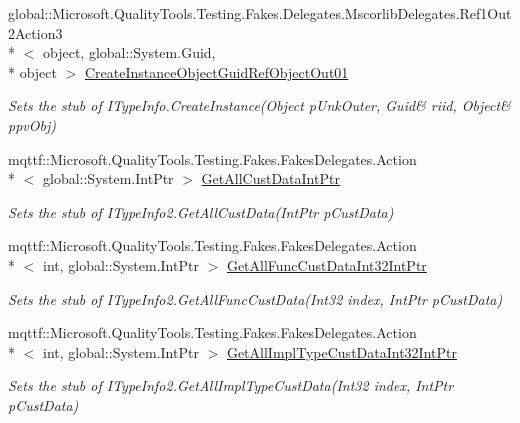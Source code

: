 \begin{DoxyCompactItemize}
global\-::\-Microsoft.\-Quality\-Tools.\-Testing.\-Fakes.\-Delegates.\-Mscorlib\-Delegates.\-Ref1\-Out2\-Action3\\*
$<$ object, global\-::\-System.\-Guid, \\*
object $>$ \hyperlink{class_system_1_1_runtime_1_1_interop_services_1_1_com_types_1_1_fakes_1_1_stub_i_type_info2_a23343d664fbd611dba2e77315f9fc012}{Create\-Instance\-Object\-Guid\-Ref\-Object\-Out01}
\begin{DoxyCompactList}\small\item\em Sets the stub of I\-Type\-Info.\-Create\-Instance(Object p\-Unk\-Outer, Guid\& riid, Object\& ppv\-Obj)\end{DoxyCompactList}\item 
mqttf\-::\-Microsoft.\-Quality\-Tools.\-Testing.\-Fakes.\-Fakes\-Delegates.\-Action\\*
$<$ global\-::\-System.\-Int\-Ptr $>$ \hyperlink{class_system_1_1_runtime_1_1_interop_services_1_1_com_types_1_1_fakes_1_1_stub_i_type_info2_a28ba9f48baf9fd88a311455065ef33b2}{Get\-All\-Cust\-Data\-Int\-Ptr}
\begin{DoxyCompactList}\small\item\em Sets the stub of I\-Type\-Info2.\-Get\-All\-Cust\-Data(\-Int\-Ptr p\-Cust\-Data)\end{DoxyCompactList}\item 
mqttf\-::\-Microsoft.\-Quality\-Tools.\-Testing.\-Fakes.\-Fakes\-Delegates.\-Action\\*
$<$ int, global\-::\-System.\-Int\-Ptr $>$ \hyperlink{class_system_1_1_runtime_1_1_interop_services_1_1_com_types_1_1_fakes_1_1_stub_i_type_info2_acea1ed67834cb0cd0d68b2dc1257781b}{Get\-All\-Func\-Cust\-Data\-Int32\-Int\-Ptr}
\begin{DoxyCompactList}\small\item\em Sets the stub of I\-Type\-Info2.\-Get\-All\-Func\-Cust\-Data(\-Int32 index, Int\-Ptr p\-Cust\-Data)\end{DoxyCompactList}\item 
mqttf\-::\-Microsoft.\-Quality\-Tools.\-Testing.\-Fakes.\-Fakes\-Delegates.\-Action\\*
$<$ int, global\-::\-System.\-Int\-Ptr $>$ \hyperlink{class_system_1_1_runtime_1_1_interop_services_1_1_com_types_1_1_fakes_1_1_stub_i_type_info2_ad8a311f471018af836fec180b35ad156}{Get\-All\-Impl\-Type\-Cust\-Data\-Int32\-Int\-Ptr}
\begin{DoxyCompactList}\small\item\em Sets the stub of I\-Type\-Info2.\-Get\-All\-Impl\-Type\-Cust\-Data(\-Int32 index, Int\-Ptr p\-Cust\-Data)\end{DoxyCompactList}\item 

\end{DoxyCompactItemize}

